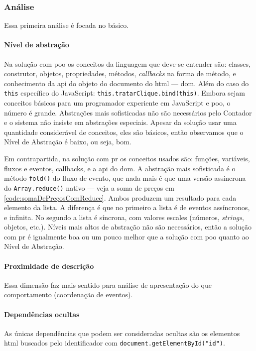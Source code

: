\subsubsection{Análise}
\label{sec:analise}

Essa primeira análise é focada no básico.
\paragraph{Nível de abstração}
\label{sec:nivel-de-abstracao}
Na solução com \gls{poo} os conceitos da linguagem que deve-se entender são:
classes, construtor, objetos, propriedades, métodos, \emph{callbacks} na forma
de método, e conhecimento da \gls{api} do objeto do documento do \gls{html} ---
\gls{dom}.
Além do caso do \texttt{this} específico do JavaScript:
\texttt{this.tratarClique.bind(this)}.
Embora sejam conceitos básicos para um programador experiente em JavaScript
e \gls{poo}, o número é grande.
Abstrações mais sofisticadas não são necessários pelo Contador e o sistema
não insiste em abstrações especiais.
Apesar da solução usar uma quantidade considerável de conceitos, eles são
básicos, então observamos que o Nível de Abstração é baixo, ou seja, bom.

Em contrapartida, na solução com \gls{pr} os conceitos usados são: funções,
variáveis, fluxos e eventos, callbacks, e a \gls{api} do \gls{dom}.
A abstração mais sofisticada é o método \texttt{fold()} do fluxo de evento,
que nada mais é que uma versão assíncrona do \texttt{Array.reduce()}
nativo --- veja a soma de preços em \ref{code:somaDePreçosComReduce}.
Ambos produzem um resultado para cada elemento da lista.
A diferença é que no primeiro a lista é de eventos assíncronos, e infinita.
No segundo a lista é síncrona, com valores escales (números, \emph{strings},
objetos, etc.).
Níveis mais altos de abstração não são necessários, então a solução com \gls{pr}
é igualmente boa ou um pouco melhor que a solução com \gls{poo} quanto ao Nível
de Abstração.
\paragraph{Proximidade de descrição}
\label{sec:proximidade-de-descricao}
Essa dimensão faz mais sentido para análise de apresentação do que
comportamento (coordenação de eventos).
\paragraph{Dependências ocultas}
\label{sec:dependencias-ocultas}
As únicas dependências que podem ser consideradas ocultas são os elementos
\gls{html} buscados pelo identificador com \texttt{document.getElementById("id")}.
